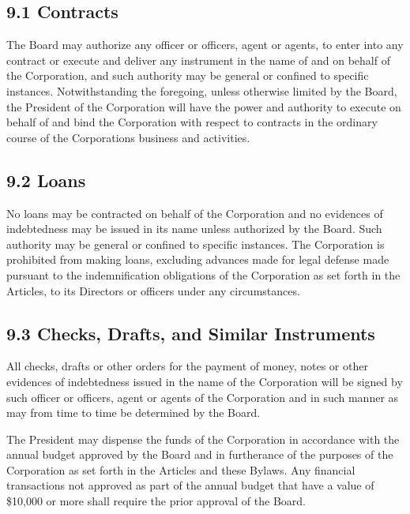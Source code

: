 \documentclass[
]{book}
\begin{document}
\subsection*{9.1 Contracts}\label{contracts}

The Board may authorize any officer or officers, agent or agents, to enter into any contract or execute and deliver any instrument in the name of and on behalf of the Corporation, and such authority may be general or confined to specific instances. Notwithstanding the foregoing, unless otherwise limited by the Board, the President of the Corporation will have the power and authority to execute on behalf of and bind the Corporation with respect to contracts in the ordinary course of the Corporation\textquotesingle s business and activities.

\subsection*{9.2 Loans}\label{loans}

No loans may be contracted on behalf of the Corporation and no evidences of indebtedness may be issued in its name unless authorized by the Board. Such authority may be general or confined to specific instances. The Corporation is prohibited from making loans, excluding advances made for legal defense made pursuant to the indemnification obligations of the Corporation as set forth in the Articles, to its Directors or officers under any circumstances.

\subsection*{9.3 Checks, Drafts, and Similar Instruments}\label{checks-drafts-and-similar-instruments}

All checks, drafts or other orders for the payment of money, notes or other evidences of indebtedness issued in the name of the Corporation will be signed by such officer or officers, agent or agents of the Corporation and in such manner as may from time to time be determined by the Board.

The President may dispense the funds of the Corporation in accordance with the annual budget approved by the Board and in furtherance of the purposes of the Corporation as set forth in the Articles and these Bylaws. Any financial transactions not approved as part of the annual budget that have a value of \$10,000 or more shall require the prior approval of the Board.
\end{document}
